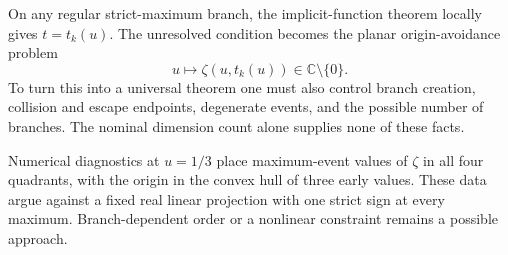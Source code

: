 On any regular strict-maximum branch, the implicit-function theorem locally
gives $t=t_k(u)$.  The unresolved condition becomes the planar
origin-avoidance problem
\[
 u\longmapsto \zeta(u,t_k(u))\in\mathbb C\setminus\{0\}.
\]
To turn this into a universal theorem one must also control branch creation,
collision and escape endpoints, degenerate events, and the possible number
of branches.  The nominal dimension count alone supplies none of these
facts.

Numerical diagnostics at $u=1/3$ place maximum-event values of $\zeta$ in
all four quadrants, with the origin in the convex hull of three early
values. These data argue against a fixed real linear projection with one
strict sign at every maximum. Branch-dependent order or a nonlinear
constraint remains a possible approach.
